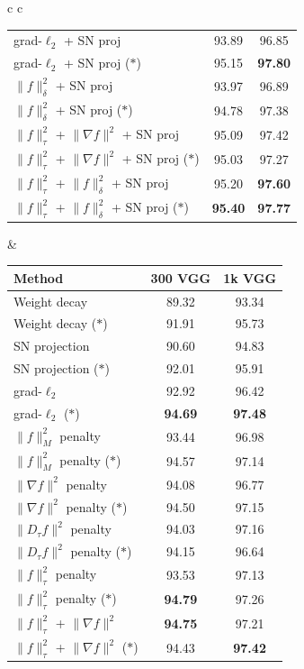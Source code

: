 \begin{table}
\begin{tabular}{c c}
\begin{tabular}{ | l | c | c |  }
grad-$\ell_2$ + SN proj & 93.89 & 96.85 \\
grad-$\ell_2$ + SN proj ($\ast$) & 95.15 & \textbf{97.80} \\
$\|f\|_\delta^2$ + SN proj & 93.97 & 96.89 \\
$\|f\|_\delta^2$ + SN proj ($\ast$) & 94.78 & 97.38 \\
$\|f\|_{\tau}^2$ + $\|\nabla f\|^2$ + SN proj & 95.09 & 97.42 \\
$\|f\|_{\tau}^2$ + $\|\nabla f\|^2$ + SN proj ($\ast$) & 95.03 & 97.27 \\
$\|f\|_{\tau}^2$ + $\|f\|^2_\delta$ + SN proj & 95.20 & \textbf{\color{darkgray}97.60} \\
$\|f\|_{\tau}^2$ + $\|f\|^2_\delta$ + SN proj ($\ast$) & \textbf{\color{darkgray}95.40} & \textbf{97.77} \\
\hline
\end{tabular}
&
\begin{tabular}{ | l | c | c |  }
\hline
Method & 300 VGG & 1k VGG \\ \hline
\hline
Weight decay & 89.32 & 93.34 \\
Weight decay ($\ast$) & 91.91 & 95.73 \\
SN projection & 90.60 & 94.83 \\
SN projection ($\ast$) & 92.01 & 95.91 \\
grad-$\ell_2$ & 92.92 & 96.42 \\
grad-$\ell_2$ ($\ast$) & \textbf{\color{darkgray}94.69} & \textbf{\color{darkgray}97.48} \\
\hline
$\|f\|_M^2$ penalty & 93.44 & 96.98 \\
$\|f\|_M^2$ penalty ($\ast$) & 94.57 & 97.14 \\
$\|\nabla f\|^2$ penalty & 94.08 & 96.77 \\
$\|\nabla f\|^2$ penalty ($\ast$) & 94.50 & 97.15 \\
$\|D_\tau f\|^2$ penalty & 94.03 & 97.16 \\
$\|D_\tau f\|^2$ penalty ($\ast$) & 94.15 & 96.64 \\
$\|f\|_\tau^2$ penalty & 93.53 & 97.13 \\
$\|f\|_\tau^2$ penalty ($\ast$) & \textbf{\color{darkgray}94.79} & 97.26 \\
$\|f\|_{\tau}^2$ + $\|\nabla f\|^2$ & \textbf{\color{darkgray}94.75} & 97.21 \\
$\|f\|_{\tau}^2$ + $\|\nabla f\|^2$ ($\ast$) & 94.43 & \textbf{\color{darkgray}97.42} \\

\end{tabular}
\end{tabular}
\end{table}
